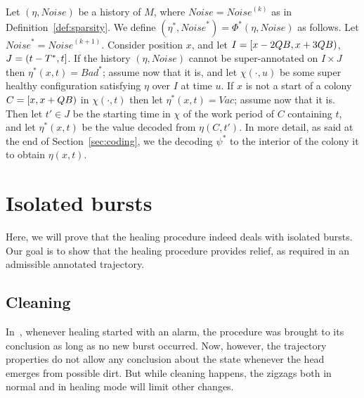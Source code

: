 \documentclass[12pt]{memoir}
\def\B{B}
\newcommand{\Bad}{\mathit{Bad}}
\newcommand{\Vacant}{\mathit{Vac}}
\newcommand{\Noise}{\mathit{Noise}}
\newcommand{\Tus}{T^{*}}
\begin{document}
\begin{definition}\label{def:cleanness-scaleup}
Let \( (\eta,\Noise) \) be a history of \( M \), where \( \Noise=\Noise^{(k)} \)
as in Definition~\ref{def:sparsity}.
We define \( (\eta^{*},\Noise^{*})=\Phi^{*}(\eta,\Noise) \) as follows.
Let \( \Noise^{*}=\Noise^{{(k+1)}} \).
Consider position \( x \), and let \( I=\lint{x-2Q\B}{x+3Q\B} \),
\( J=\rint{t-\Tus}{t} \).
If the history \( (\eta,\Noise) \) cannot be super-annotated on \( I\times J \)
then \( \eta^{*}(x,t)=\Bad^{*} \); assume now that it is, and let
\( \chi(\cdot,u) \) be some super healthy configuration satisfying \( \eta \) over 
\( I \) at time \( u \).
If \( x \) is not a start of a colony \( C=\lint{x}{x+Q\B} \) in \( \chi(\cdot,t) \)
then let \( \eta^{*}(x,t)=\Vacant \); assume now that it is.
Then let \( t'\in J \) be the starting time in \( \chi \) of the work period of \( C \)
containing \( t \),
and let \( \eta^{*}(x,t) \) be the value decoded from \( \eta(C,t') \).
In more detail, as said at the end of Section~\ref{sec:coding}, we the decoding
\( \psi^{*} \) to the interior of the colony it to obtain \( \eta(x,t) \).
\end{definition}




\section{Isolated bursts}\label{sec:1-level-noise}

Here, we will prove that the healing procedure indeed deals with isolated bursts.
Our goal is to show that the healing procedure provides relief, as required in an
admissible annotated trajectory.

\subsection{Cleaning}

In~\cite{burstyTuring13}, whenever healing started with an alarm, the procedure
was brought to its conclusion as long as no new burst occurred.
Now, however, the trajectory properties do not allow any conclusion about the
state whenever the head emerges from possible dirt.
But while cleaning happens, the
zigzags both in normal and in healing mode will limit other changes.

\end{document}
